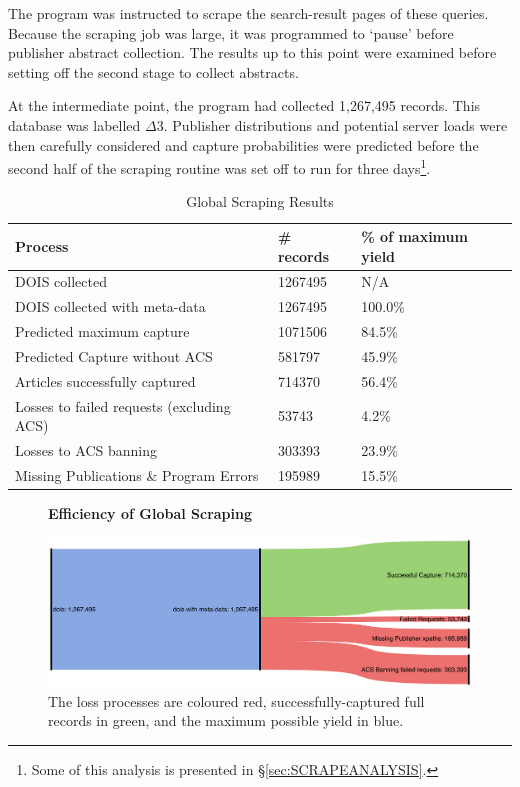 The program was instructed to scrape the search-result pages of these queries. Because the scraping job was large, it was programmed to `pause' before publisher abstract collection. The results up to this point were examined before setting off the second stage to collect abstracts.

At the intermediate point, the program had collected 1,267,495 records. This database was labelled $\Delta3$. Publisher distributions and potential server loads were then carefully considered and capture probabilities were predicted before the second half of the scraping routine was set off to run for three days\footnote{Some of this analysis is presented in \S\ref{sec:SCRAPEANALYSIS}.}.
\newpage
\vspace*{-3cm}
\begin{table}[H]
\caption{Global Scraping Results}
\label{tab:LARGESCRAPERES}
\begin{center}
\begin{tabular}{||l|l|l||}
\hline
Process & \# records & \% of maximum yield\\
\hline
DOIS collected &  1267495 &N/A\\
DOIS collected with meta-data &  1267495 &100.0\%\\

\hline
Predicted maximum capture & 1071506 &  84.5\%\\
Predicted Capture without ACS & 581797 & 45.9\%\\
\hline
Articles successfully captured & 714370 & 56.4\%\\
Losses to failed requests (excluding ACS)& 53743 & 4.2\%\\
Losses to ACS banning & 303393 & 23.9\%\\
Missing Publications \& Program Errors & 195989 & 15.5\%\\
\hline
\end{tabular}
\end{center}
\end{table}
\begin{figure}[H]
    \centering
    \textbf{Efficiency of Global Scraping}\par\medskip
    \includegraphics[width=\textwidth]{Data_Acquisition/large_sankey.png}
    \caption[Efficiency of Large Scale Scraping]{The loss processes are coloured red, successfully-captured full records in green, and the maximum possible yield in blue.}
     \label{fig:LARGESANK}
\end{figure}
